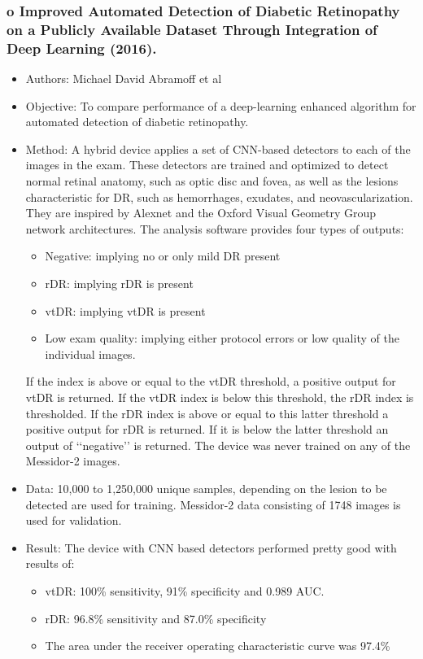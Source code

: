 \documentclass[12pt]{report}
\begin{document}
\subsubsection{o   Improved Automated Detection of Diabetic Retinopathy on a Publicly Available Dataset Through Integration of Deep Learning (2016). \cite{abramoff2016improved}}
\begin{itemize}
\item Authors: Michael David Abramoff  et al
\item Objective: To compare performance of a deep-learning enhanced algorithm for automated detection of diabetic retinopathy.
\item Method: A hybrid device applies a set of CNN-based detectors to each of the images in the exam. These detectors are trained and optimized to detect normal retinal anatomy, such as optic disc and fovea, as well as the lesions characteristic for DR, such as hemorrhages, exudates, and neovascularization. They are inspired by Alexnet and the Oxford Visual Geometry Group network architectures. The analysis software provides four types of outputs:
\begin{itemize}
\item Negative: implying no or only mild DR present
\item rDR: implying rDR is present
\item vtDR: implying vtDR is present
\item Low exam quality: implying either protocol errors or low quality of the individual images.
\end{itemize}
If the index is above or equal to the vtDR threshold, a positive output for vtDR is returned. If the vtDR index is below this threshold, the rDR index is thresholded. If the rDR index is above or equal to this latter threshold a positive output for rDR is returned. If it is below the latter threshold an output of ‘‘negative’’ is returned. The device was never trained on any of the Messidor-2 images.
\item Data: 10,000 to 1,250,000 unique samples, depending on the lesion to be detected are used for training. Messidor-2 data consisting of 1748 images is used for validation.
\item Result: The device with CNN based detectors performed pretty good with results of:
\begin{itemize}
\item vtDR: 100\% sensitivity, 91\% specificity and 0.989 AUC.
\item rDR: 96.8\% sensitivity and 87.0\% specificity
\item The area under the receiver operating characteristic curve was 97.4\%
\end{itemize}
\end{itemize}
\end{document}
